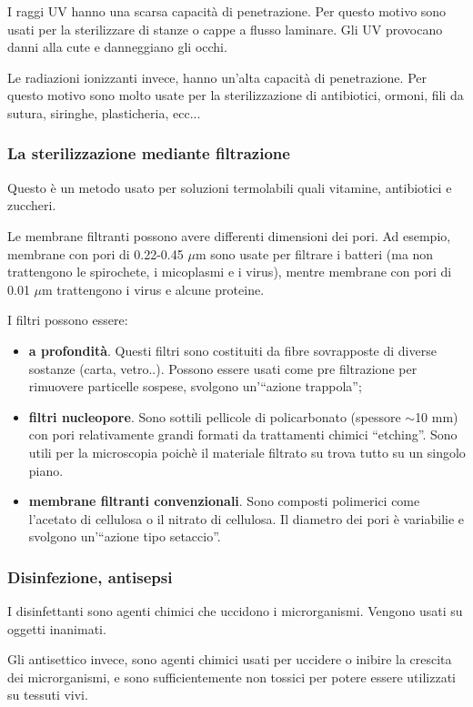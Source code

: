 \documentclass[11pt]{book}
\begin{document}
I raggi UV hanno una scarsa capacità di penetrazione. Per questo motivo sono usati per la sterilizzare  di stanze o cappe a flusso laminare. 
Gli UV provocano danni alla cute e danneggiano gli occhi.

Le radiazioni ionizzanti invece, hanno un'alta capacità di penetrazione. Per questo motivo sono molto usate per la sterilizzazione di antibiotici, ormoni, fili da sutura, siringhe, plasticheria, ecc...


\subsubsection{La sterilizzazione mediante filtrazione}
Questo è un metodo usato per soluzioni termolabili quali vitamine, antibiotici e zuccheri. 

Le membrane filtranti possono avere differenti dimensioni dei pori. Ad esempio, membrane con pori di 0.22-0.45 $\mu$m sono usate per filtrare i batteri (ma non trattengono le spirochete, i micoplasmi e i virus), mentre membrane con pori di 0.01 $\mu$m trattengono i virus e alcune proteine.

I filtri possono essere:
\begin{itemize}
\item \textbf{a profondità}. Questi filtri sono costituiti da fibre sovrapposte di diverse sostanze (carta, vetro..). Possono essere usati come pre filtrazione per rimuovere particelle sospese, svolgono un'``azione trappola'';
\item \textbf{filtri nucleopore}. Sono sottili pellicole di policarbonato (spessore $\sim$10 mm) con pori relativamente grandi formati da trattamenti chimici “etching”. Sono utili per la microscopia poichè il materiale filtrato su trova tutto su un singolo piano.
\item \textbf{membrane filtranti convenzionali}. Sono composti polimerici come l'acetato di cellulosa o il nitrato di cellulosa. Il diametro dei pori è variabilie e svolgono un'``azione tipo setaccio''.
\end{itemize}

\clearpage
\subsubsection{Disinfezione, antisepsi}
I disinfettanti sono agenti chimici che uccidono i microrganismi. Vengono usati su oggetti inanimati.

Gli antisettico invece, sono agenti chimici usati per uccidere o inibire la crescita dei microrganismi, e sono sufficientemente non tossici per potere essere utilizzati su tessuti vivi.
\end{document}
